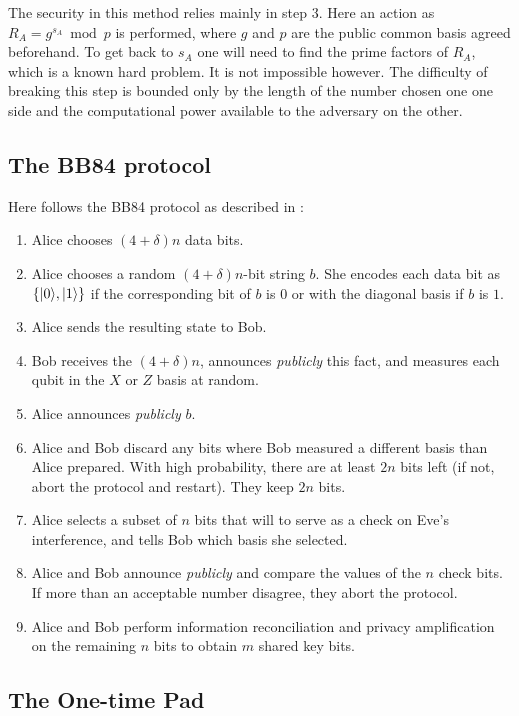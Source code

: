 	The security in this method relies mainly in step 3. 
	Here an action as $ R_A = g^{s_A} \bmod p $ is performed, where $g$ and $p$ are the public common basis agreed beforehand. 
	To get back to $s_A$  one will need to find the prime factors of $R_A$, which is a known hard problem. 
	It is not impossible however. 
	The difficulty of breaking this step is bounded only by the length of the number chosen one one side and the computational power available to the adversary on the other.
	\subsection{The BB84 protocol}
	Here follows the BB84 protocol as described in \cite{NC10} :
		\begin{enumerate}
			\item Alice chooses $(4+\delta )n$ data bits.
			\item Alice chooses a random $(4+\delta )n$-bit string $b$. She encodes each data bit as $\{|0 \rangle,|1 \rangle\}$ if the corresponding bit of $b$ is $0$ or with the diagonal basis if $b$ is $1$.
			\item Alice sends the resulting state to Bob.
			\item Bob receives the $(4+\delta )n$, announces \emph{publicly} this fact, and measures each qubit in the $X$ or $Z$ basis at random.
			\item Alice announces \emph{publicly} $b$.
			\item Alice and Bob discard any bits where Bob measured a different basis than Alice prepared. With high probability, there are at least $2n$ bits left (if not, abort the protocol and restart). They keep $2n$ bits.
			\item Alice selects a subset of $n$ bits that will to serve as a check on Eve's interference, and tells Bob which basis she selected.
			\item Alice and Bob announce \emph{publicly} and compare the values of the $n$ check bits. If more than an acceptable number disagree, they abort the protocol.
			\item Alice and Bob perform information reconciliation and privacy amplification on the remaining $n$ bits to obtain $m$ shared key bits.
		\end{enumerate}
		
	\subsection{The One-time Pad}
		
